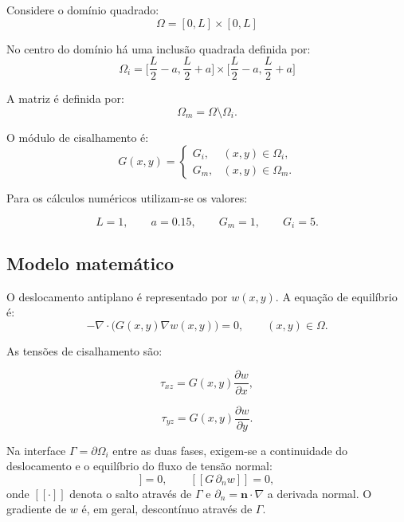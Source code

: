 \documentclass[brazil]{TCAM} %
\begin{document}
Considere o domínio quadrado:
\begin{equation*}
    \Omega = [0,L] \times [0,L]
\end{equation*}

No centro do domínio há uma inclusão quadrada definida por:
\begin{equation*}
    \Omega_i = \Big[\dfrac{L}{2}-a, \dfrac{L}{2}+a\Big] \times \Big[\dfrac{L}{2}-a, \dfrac{L}{2}+a\Big]
\end{equation*}

A matriz é definida por:
\begin{equation*}
    \Omega_m = \Omega \setminus \Omega_i.
\end{equation*}

O módulo de cisalhamento é:
\begin{equation*}
    G(x,y)=
\begin{cases}
G_i, & (x,y)\in\Omega_i,\\[2mm]
G_m, & (x,y)\in\Omega_m.
\end{cases}
\end{equation*}

Para os cálculos numéricos utilizam-se os valores:

\begin{equation*}
    L = 1,
\qquad
a = 0.15,
\qquad
G_m = 1,
\qquad
G_i = 5.
\end{equation*}

\subsection{Modelo matemático}

O deslocamento antiplano é representado por $w(x,y)$. A equação de equilíbrio é:
\begin{equation}
    -\nabla \cdot \bigl(G(x,y)\nabla w(x,y)\bigr)=0,
\qquad
(x,y)\in\Omega.
\label{eq}
\end{equation}

As tensões de cisalhamento são:

\[
\tau_{xz}
=
G(x,y)\frac{\partial w}{\partial x},
\]

\[
\tau_{yz}
=
G(x,y)\frac{\partial w}{\partial y}.
\]

Na interface $\Gamma=\partial\Omega_i$ entre as duas fases, exigem-se a
continuidade do deslocamento e o equilíbrio do fluxo de tensão normal:
\begin{equation}
    [\![ w ]\!] = 0,
    \qquad
    [\![ G\,\partial_n w ]\!] = 0,
    \label{eq:interface}
\end{equation}
onde $[\![\cdot]\!]$ denota o salto através de $\Gamma$ e
$\partial_n = \mathbf{n}\cdot\nabla$ a derivada normal. O gradiente de $w$ é, em
geral, descontínuo através de $\Gamma$.
\end{document}
